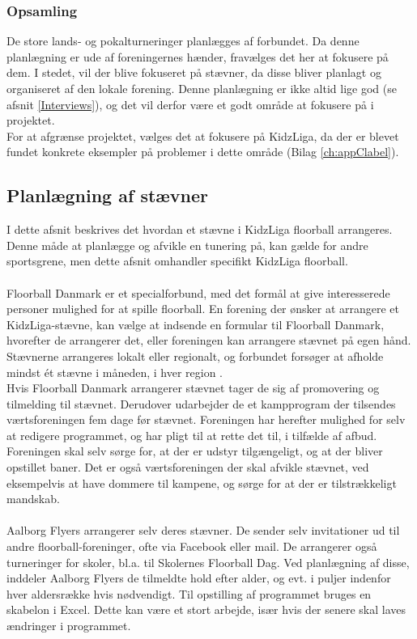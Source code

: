\subsubsection*{Opsamling}
De store lands- og pokalturneringer planlægges af forbundet. Da denne planlægning er ude af foreningernes hænder, fravælges det her at fokusere på dem. I stedet, vil der blive fokuseret på stævner, da disse bliver planlagt og organiseret af den lokale forening. Denne planlægning er ikke altid lige god (se afsnit \ref{Interviews}), og det vil derfor være et godt område at fokusere på i projektet.\\
For at afgrænse projektet, vælges det at fokusere på KidzLiga, da der er blevet fundet konkrete eksempler på problemer i dette område (Bilag \ref{ch:appClabel}). 

\subsection{Planlægning af stævner}
I dette afsnit beskrives det hvordan et stævne i KidzLiga floorball arrangeres. Denne måde at planlægge og afvikle en tunering på, kan gælde for andre sportsgrene, men dette afsnit omhandler specifikt KidzLiga floorball.
\\\\
Floorball Danmark er et specialforbund, med det formål at give interesserede personer mulighed for at spille floorball. En forening der ønsker at arrangere et KidzLiga-stævne, kan vælge at indsende en formular til Floorball Danmark, hvorefter de arrangerer det, eller foreningen kan arrangere stævnet på egen hånd. Stævnerne arrangeres lokalt eller regionalt, og forbundet forsøger at afholde mindst ét stævne i måneden, i hver region \citep{kidzRegler}.\\
Hvis Floorball Danmark arrangerer stævnet tager de sig af promovering og tilmelding til stævnet. Derudover udarbejder de et kampprogram der tilsendes værtsforeningen fem dage før stævnet. Foreningen har herefter mulighed for selv at redigere programmet, og har pligt til at rette det til, i tilfælde af afbud.\\
Foreningen skal selv sørge for, at der er udstyr tilgængeligt, og at der bliver opstillet baner. Det er også værtsforeningen der skal afvikle stævnet, ved eksempelvis at have dommere til kampene, og sørge for at der er tilstrækkeligt mandskab\citep{kidzRegler}. 
\\\\
Aalborg Flyers arrangerer selv deres stævner. De sender selv invitationer ud til andre floorball-foreninger, ofte via Facebook eller mail. De arrangerer også turneringer for skoler, bl.a. til Skolernes Floorball Dag. Ved planlægning af disse, inddeler Aalborg Flyers de tilmeldte hold efter alder, og evt. i puljer indenfor hver aldersrække hvis nødvendigt. Til opstilling af programmet bruges en skabelon i Excel. Dette kan være et stort arbejde, især hvis der senere skal laves ændringer i programmet.

